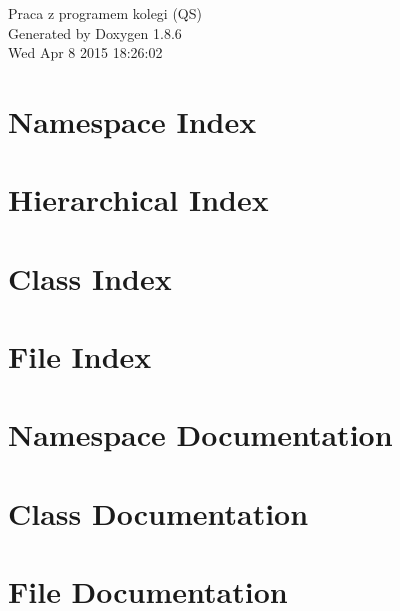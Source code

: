 \documentclass[twoside]{book}
\newcommand{\clearemptydoublepage}{%
  \newpage{\pagestyle{empty}\cleardoublepage}%
}
\begin{document}
\begin{titlepage}
\vspace*{7cm}
\begin{center}%
{\Large Praca z programem kolegi (Q\-S) }\\
\vspace*{1cm}
{\large Generated by Doxygen 1.8.6}\\
\vspace*{0.5cm}
{\small Wed Apr 8 2015 18:26:02}\\
\end{center}
\end{titlepage}
\clearemptydoublepage
\tableofcontents
\clearemptydoublepage
{}

\chapter{Namespace Index}

\chapter{Hierarchical Index}

\chapter{Class Index}

\chapter{File Index}

\chapter{Namespace Documentation}


\chapter{Class Documentation}







\chapter{File Documentation}


















\newpage
{}
{}
\printindex
\end{document}
